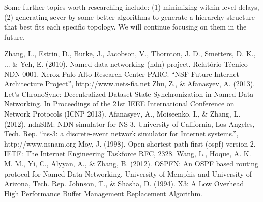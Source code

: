 \documentclass[conference]{IEEEtran}
\begin{document}
Some further topics worth researching include:
(1) minimizing within-level delays,
(2) generating sever by some better algorithms to generate a hierarchy structure
that best fits each specific topology. We will continue focusing on them in the future.


\begin{thebibliography}{1}

	Zhang, L., Estrin, D., Burke, J., Jacobson, V., Thornton, J. D., Smetters, D. K., ... \& Yeh, E. (2010). Named data networking (ndn) project. Relatório Técnico NDN-0001, Xerox Palo Alto Research Center-PARC.
	``NSF Future Internet Architecture Project'', http://www.nets-fia.net
	Zhu, Z., \& Afanasyev, A. (2013). Let’s ChronoSync: Decentralized Dataset State Synchronization in Named Data Networking. In Proceedings of the 21st IEEE International Conference on Network Protocols (ICNP 2013).
	Afanasyev, A., Moiseenko, I., \& Zhang, L. (2012). ndnSIM: NDN simulator for NS-3. University of California, Los Angeles, Tech. Rep.
	``ns-3: a discrete-event network simulator for Internet systems.'', http://www.nsnam.org
	Moy, J. (1998). Open shortest path first (ospf) version 2. IETF: The Internet Engineering Taskforce RFC, 2328.
	Wang, L., Hoque, A. K. M. M., Yi, C., Alyyan, A., \& Zhang, B. (2012). OSPFN: An OSPF based routing protocol for Named Data Networking. University of Memphis and University of Arizona, Tech. Rep.
	Johnson, T., \& Shasha, D. (1994). X3: A Low Overhead High Performance Buffer Management Replacement Algorithm.

\end{thebibliography}
\end{document}
